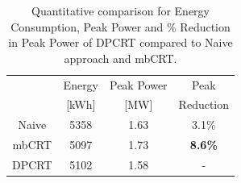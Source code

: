 
\begin{table}
  \centering
  \caption{Quantitative comparison for Energy Consumption, Peak Power and \% Reduction in Peak Power of DPCRT compared to Naive approach and mbCRT.}
    \begin{tabular}{c|c|c|c}
    \toprule
     & Energy  & Peak Power & Peak \\
     & [kWh] & [MW] & Reduction\\     
    \midrule
    Naive    & 5358  &  1.63 &   3.1\% \\
    mbCRT     & 5097 &  1.73 &   \textbf{8.6\%} \\
    DPCRT     & 5102  &  1.58 &  - \\
    \bottomrule
    \end{tabular}
  \label{T:case_quant}
\end{table}
